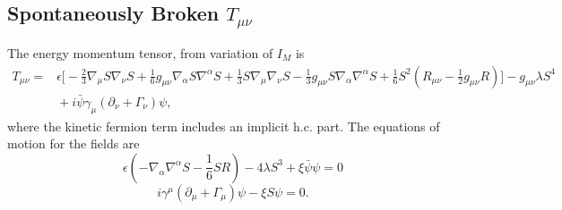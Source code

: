 \documentclass[10pt,letterpaper]{article}
\numberwithin{equation}{subsection}
\begin{document}
\subsection{Spontaneously Broken $T_{\mu\nu}$}
The energy momentum tensor, from variation of $I_M$ is
\begin{align}
	T_{\mu\nu} =&{}
	 \epsilon\bigg[ -\frac23 \nabla_\mu S\nabla_\nu S + \frac16 g_{\mu\nu} \nabla_\alpha S\nabla^\alpha S + \frac13
	S \nabla_\mu \nabla_\nu S -\frac13 g_{\mu\nu} S\nabla_\alpha\nabla^\alpha S+ \frac16 S^2\left( R_{\mu\nu} - \frac12 g_{\mu\nu}R\right)\bigg] - g_{\mu\nu}\lambda S^4
\nonumber\\
&{} +  i\bar\psi \gamma_\mu(\partial_\nu +\Gamma_\nu)\psi,
\end{align}
where the kinetic fermion term includes an implicit $\text{h.c.}$ part.  
The equations of motion for the fields are
\begin{equation}
	\epsilon\left( -\nabla_\alpha \nabla^\alpha S -\frac16 S R\right) - 4\lambda S^3 + \xi \bar\psi\psi = 0
\end{equation}
\begin{equation}
i\gamma^\mu(\partial_\mu +\Gamma_\mu)\psi - \xi S\psi = 0.
\end{equation}
\end{document}
